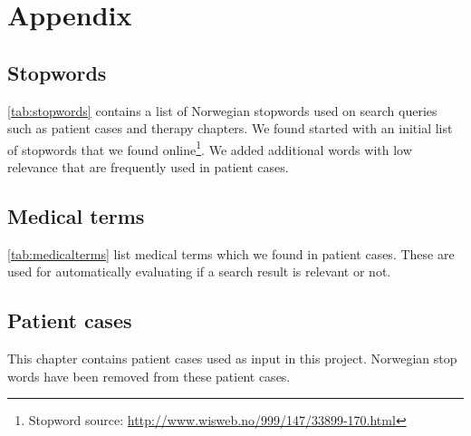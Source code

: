 \documentclass[11pt,a4paper]{report}
\begin{document}


\setcounter{tocdepth}{1} %
\clearpage
{}
{}
\listoftables


\clearpage
{}








%


\appendix
\chapter{Appendix}
\label{appendix}


\section{Stopwords}
\autoref{tab:stopwords} contains a list of Norwegian stopwords used on search
queries such as patient cases and therapy chapters.
We found started with an initial list of stopwords that we found
online\footnote{Stopword source: \url{http://www.wisweb.no/999/147/33899-170.html}}.
We added additional words with low relevance that are frequently used in
patient cases.


\section{Medical terms}
\autoref{tab:medicalterms} list medical terms which we found in patient cases.
These are used for automatically evaluating if a search result is relevant or
not.


\section{Patient cases}
This chapter contains patient cases used as input in this project.
Norwegian stop words have been removed from these patient cases.





\end{document}
